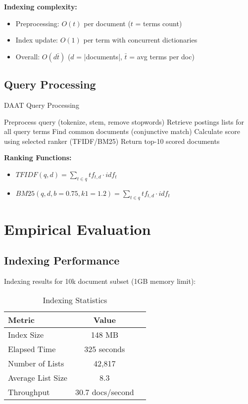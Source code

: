 \textbf{Indexing complexity:}

\begin{itemize}
  \item Preprocessing: $O(t)$ per document ($t$ = terms count)
  \item Index update: $O(1)$ per term with concurrent dictionaries
  \item Overall: $O(d \bar{t})$ ($d$ = |documents|, $\bar{t}$ = avg terms per doc)
\end{itemize}

\subsection{Query Processing} \label{subsec:query-processing}
\begin{algorithm}[H]
  \caption{DAAT Query Processing}
  \begin{algorithmic}
    \STATE Preprocess query (tokenize, stem, remove stopwords)
    \STATE Retrieve postings lists for all query terms
    \STATE Find common documents (conjunctive match)
    \STATE Calculate score using selected ranker (TFIDF/BM25)
    \ENDFOR
    \STATE Return top-10 scored documents
  \end{algorithmic}
\end{algorithm}

\textbf{Ranking Functions:}
\begin{itemize}
  \item $TFIDF(q, d) = \sum_{t \in q} tf_{t,d} \cdot idf_t$ \label{eq:tfidf}
  \item $BM25(q, d, b=0.75, k1=1.2) = \sum_{t \in q} tf_{t,d} \cdot idf_t$ \label{eq:bm25}
\end{itemize}

\section{Empirical Evaluation}

\subsection{Indexing Performance}
Indexing results for 10k document subset (1GB memory limit):

\begin{table}[htbp]
  \caption{Indexing Statistics}
  \label{tab:index-stats}
  \begin{tabular}{lcc}
    \toprule
    \textbf{Metric}   & \textbf{Value}   \\
    \midrule
    Index Size        & 148 MB           \\
    Elapsed Time      & 325 seconds      \\
    Number of Lists   & 42,817           \\
    Average List Size & 8.3              \\
    Throughput        & 30.7 docs/second \\
    \bottomrule
  \end{tabular}
\end{table}

